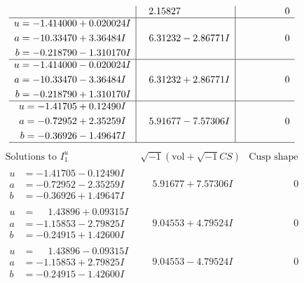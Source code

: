 \documentclass[1p]{elsarticle_modified}
\theoremstyle{definition}
\newcommand{\I}{\sqrt{-1}}
\begin{document}
$$\begin{array}{c|c|c}
 & \phantom{-}2.15827\phantom{ +0.000000I} & \phantom{-0.000000 } 0 \\ \hline\begin{aligned}
u &= -1.414000 + 0.020024 I \\
a &= -10.33470 + 3.36484 I \\
b &= -0.218790 - 1.310170 I\end{aligned}
 & \phantom{-}6.31232 - 2.86771 I & \phantom{-0.000000 } 0 \\ \hline\begin{aligned}
u &= -1.414000 - 0.020024 I \\
a &= -10.33470 - 3.36484 I \\
b &= -0.218790 + 1.310170 I\end{aligned}
 & \phantom{-}6.31232 + 2.86771 I & \phantom{-0.000000 } 0 \\ \hline\begin{aligned}
u &= -1.41705 + 0.12490 I \\
a &= -0.72952 + 2.35259 I \\
b &= -0.36926 - 1.49647 I\end{aligned}
 & \phantom{-}5.91677 - 7.57306 I & \phantom{-0.000000 } 0\\
 \hline 
 \end{array}$$\newpage$$\begin{array}{c|c|c}  
\text{Solutions to }I^u_{1}& \I (\text{vol} + \sqrt{-1}CS) & \text{Cusp shape}\\
 \hline 
\begin{aligned}
u &= -1.41705 - 0.12490 I \\
a &= -0.72952 - 2.35259 I \\
b &= -0.36926 + 1.49647 I\end{aligned}
 & \phantom{-}5.91677 + 7.57306 I & \phantom{-0.000000 } 0 \\ \hline\begin{aligned}
u &= \phantom{-}1.43896 + 0.09315 I \\
a &= -1.15853 - 2.79825 I \\
b &= -0.24915 + 1.42600 I\end{aligned}
 & \phantom{-}9.04553 + 4.79524 I & \phantom{-0.000000 } 0 \\ \hline\begin{aligned}
u &= \phantom{-}1.43896 - 0.09315 I \\
a &= -1.15853 + 2.79825 I \\
b &= -0.24915 - 1.42600 I\end{aligned}
 & \phantom{-}9.04553 - 4.79524 I & \phantom{-0.000000 } 0 \\ \hline\begin{aligned}

\end{aligned}
\end{array}$$
\end{document}
